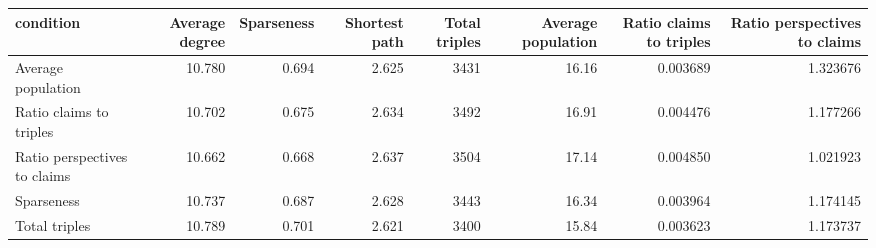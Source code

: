 \begin{tabular}{lrrrrrrr}
\toprule
                   condition &  Average degree &  Sparseness &  Shortest path &  Total triples &  Average population &  Ratio claims to triples &  Ratio perspectives to claims \\
\midrule
          Average population &          10.780 &       0.694 &          2.625 &           3431 &               16.16 &                 0.003689 &                      1.323676 \\
     Ratio claims to triples &          10.702 &       0.675 &          2.634 &           3492 &               16.91 &                 0.004476 &                      1.177266 \\
Ratio perspectives to claims &          10.662 &       0.668 &          2.637 &           3504 &               17.14 &                 0.004850 &                      1.021923 \\
                  Sparseness &          10.737 &       0.687 &          2.628 &           3443 &               16.34 &                 0.003964 &                      1.174145 \\
               Total triples &          10.789 &       0.701 &          2.621 &           3400 &               15.84 &                 0.003623 &                      1.173737 \\
\bottomrule
\end{tabular}
